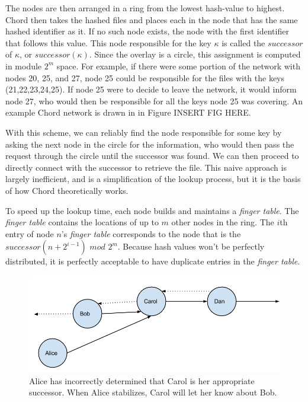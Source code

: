 \documentclass[conference, compsocconf, letterpaper]{IEEEtran}
\begin{document}
The nodes are then arranged in a ring from the lowest hash-value to highest.  Chord then takes the hashed files and places each in the node that has the same hashed identifier as it.  If no such node exists, the node with the first identifier that follows this value.  This node responsible for the key $\kappa$ is called the $successor$ of $\kappa$, or $successor(\kappa)$.  Since the overlay is a circle, this assignment is computed in module $2^m$ space.  For example, if there were some portion of the network with nodes 20, 25, and 27, node 25 could be responsible for the files with the keys (21,22,23,24,25). If node 25 were to decide to leave the network, it would inform node 27, who would then be responsible for all the keys node 25 was covering. An example Chord network is drawn in in Figure INSERT FIG HERE.

With this scheme, we can reliably find the node responsible for some key by asking the next node in the circle for the information, who would then pass the request through the circle until the successor was found.  We can then proceed to directly connect with the successor to retrieve the file.  This naive approach is largely inefficient, and is a simplification of the lookup process, but it is the basis of how Chord theoretically works.

To speed up the lookup time, each node builds and maintains a \emph{finger table}.  The \emph{finger table} contains the locations of up to $m$ other nodes in the ring.  The $i$th entry of node $n$'s \emph{finger table} corresponds to the node that is the $successor(n+2^{i-1})$ $mod$ $2^m$. Because hash values won't be perfectly distributed, it is perfectly acceptable to have duplicate entries in the \emph{finger table}. 


\begin{figure}
    \includegraphics[width=\linewidth]{abcd1}
    \caption{Alice has incorrectly determined that Carol is her appropriate successor.  When Alice stabilizes, Carol will let her know about Bob.}
    \label{abcd1}
\end{figure}
\end{document}
